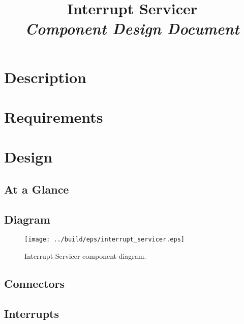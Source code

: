



\title{\textbf{Interrupt Servicer} \\
\large\textit{Component Design Document}}
\date{}
\maketitle

\section{Description}


\section{Requirements}


\section{Design}

\subsection{At a Glance}


\subsection{Diagram}
\begin{figure}[H]
  \texttt{[image: ../build/eps/interrupt\_servicer.eps]}
  \caption{Interrupt Servicer component diagram.}
\end{figure}



\subsection{Connectors}


\subsection{Interrupts}



